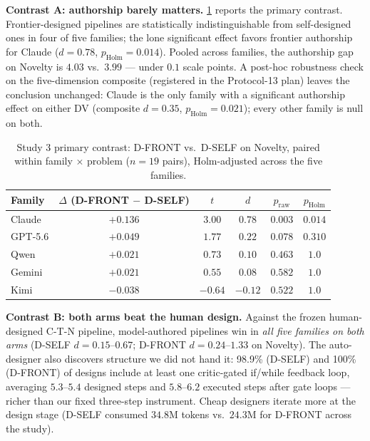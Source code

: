 \documentclass[12pt,a4paper]{article}
\begin{document}
\textbf{Contrast A: authorship barely matters.}
\cref{tab:study3-authorship} reports the primary contrast. Frontier-designed
pipelines are statistically indistinguishable from self-designed ones in four
of five families; the lone significant effect favors frontier authorship for
Claude ($d = 0.78$, $p_{\text{Holm}} = 0.014$). Pooled across families, the
authorship gap on Novelty is $4.03$ vs.\ $3.99$ --- under $0.1$ scale points.
A post-hoc robustness check on the five-dimension composite (registered in
the Protocol-13 plan) leaves the conclusion unchanged: Claude is the only
family with a significant authorship effect on either DV (composite
$d = 0.35$, $p_{\text{Holm}} = 0.021$); every other family is null on both.

\begin{table}[ht]
  \centering
  \caption{Study 3 primary contrast: D-FRONT vs.\ D-SELF on Novelty, paired
  within family $\times$ problem ($n = 19$ pairs), Holm-adjusted across the
  five families.}
  \label{tab:study3-authorship}
  \begin{tabular}{@{}l c c c c c@{}}
    \toprule
    \textbf{Family} & $\Delta$ (D-FRONT $-$ D-SELF) & $t$ & $d$ &
      $p_{\text{raw}}$ & $p_{\text{Holm}}$ \\
    \midrule
    Claude & $+0.136$ & $3.00$ & $0.78$ & $0.003$ & $\mathbf{0.014}$ \\
    GPT-5.6 & $+0.049$ & $1.77$ & $0.22$ & $0.078$ & $0.310$ \\
    Qwen & $+0.021$ & $0.73$ & $0.10$ & $0.463$ & $1.0$ \\
    Gemini & $+0.021$ & $0.55$ & $0.08$ & $0.582$ & $1.0$ \\
    Kimi & $-0.038$ & $-0.64$ & $-0.12$ & $0.522$ & $1.0$ \\
    \bottomrule
  \end{tabular}
\end{table}

\textbf{Contrast B: both arms beat the human design.} Against the frozen
human-designed C-T-N pipeline, model-authored pipelines win in \emph{all five
families on both arms} (D-SELF $d = 0.15$--$0.67$; D-FRONT $d = 0.24$--$1.33$
on Novelty). The auto-designer also discovers structure we did not hand it:
98.9\% (D-SELF) and 100\% (D-FRONT) of designs include at least one
critic-gated if/while feedback loop, averaging $5.3$--$5.4$ designed steps and
$5.8$--$6.2$ executed steps after gate loops --- richer than our fixed
three-step instrument. Cheap designers iterate more at the design stage
(D-SELF consumed $34.8$M tokens vs.\ $24.3$M for D-FRONT across the study).
\end{document}
